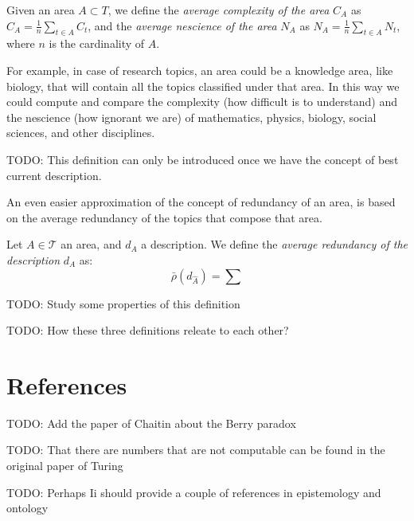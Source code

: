 \begin{definition}
Given an area $A\subset T$, we define the \emph{average complexity of the area} $C_{A}$ as $C_{A}=\frac{1}{n}\sum_{t\in A}C_{t}$, and the \emph{average nescience of the area} $N_{A}$ as $N_{A}=\frac{1}{n}\sum_{t\in A}N_{t}$, where $n$ is the cardinality of $A$.
\end{definition}

For example, in case of research topics, an area could be a knowledge area, like biology, that will contain all the topics classified under that area. In this way we could compute and compare the complexity (how difficult is to understand) and the nescience (how ignorant we are) of mathematics, physics, biology, social sciences, and other disciplines.

{\color{red} TODO: This definition can only be introduced once we have the concept of best current description.}

An even easier approximation of the concept of redundancy of an area, is based on the average redundancy of the topics that compose that area.

\begin{definition}
Let $A \in \mathcal{T}$ an area, and $d_A$ a description. We define the \emph{average redundancy of the description} $d_A$ as:
\[
\bar{\rho}(d_{\hat{A}}) = \sum
\]
\end{definition}

{\color{red} TODO: Study some properties of this definition}

{\color{red} TODO: How these three definitions releate to each other?}



%
%

\section*{References}

{\color{red} TODO: Add the paper of Chaitin about the Berry paradox}

{\color{red} TODO: That there are numbers that are not computable can be found in the original paper of Turing}

{\color{red} TODO: Perhaps Ii should provide a couple of references in epistemology and ontology}
